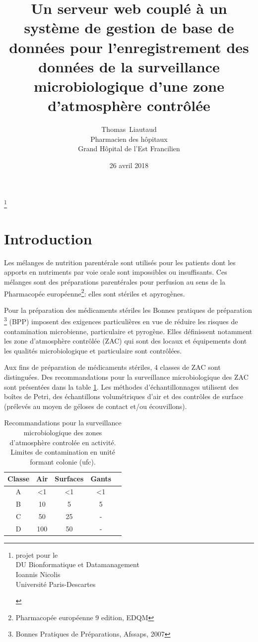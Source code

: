 \documentclass[12pt,a4paper,oneside]{article}
\author{Thomas~Liautaud\\Pharmacien des hôpitaux\\Grand Hôpital de l'Est Francilien}
\date{26 avril 2018}
\title{Un serveur web couplé à un système de gestion de base de données pour l'enregistrement des données de la surveillance microbiologique d'une zone d'atmosphère contrôlée}
\begin{document}
\maketitle
\thanks{\begin{center}
projet pour le \\DU Bionformatique et Datamanagement\\ Ioannis Nicolis\\Université Paris-Descartes
\end{center}}
\tableofcontents
\section{Introduction}
Les mélanges de nutrition parentérale sont utilisés pour les patients dont les apports en nutriments par voie orale sont impossibles ou insuffisants. Ces mélanges sont des préparations parentérales pour perfusion au sens de la Pharmacopée européenne\footnote{Pharmacopée européenne 9 edition, EDQM}: elles sont stériles et apyrogènes.

Pour la préparation des médicaments stériles les Bonnes pratiques de préparation \footnote{Bonnes Pratiques de Préparations, Afssaps, 2007} (BPP) imposent des  exigences  particulières en vue de réduire les risques de contamination microbienne, particulaire et pyrogène. Elles définissent notamment les zone d'atmosphère contrôlée (ZAC) qui sont des locaux et équipements dont les qualités microbiologique et particulaire sont contrôlées.

Aux fins de préparation de médicaments stériles, 4 classes de ZAC sont distinguées. Des recommandations pour la surveillance microbiologique des ZAC sont présentées dans la table \ref{zac}. Les méthodes d'échantillonnages utilisent des boîtes de Petri, des échantillons volumétriques d'air et des contrôles de surface (prélevés au moyen de géloses de contact et/ou écouvillons).
\begin{table}[h]
\caption{Recommandations pour la surveillance microbiologique des zones d'atmosphère controlée en activité. Limites de contamination en unité formant colonie (ufc).\label{zac}}
\begin{center}
\begin{tabular}{|c|c|c|c|c|}
	\hline
	\textbf{Classe} & \textbf{Air} &\textbf{Surfaces} & \textbf{Gants}\\
	\hline
	A & <1 & <1 & <1\\
	B & 10 & 5 & 5\\
	C & 50 & 25 & -\\
	D & 100 & 50 & -\\
	
	\hline
\end{tabular}
\end{center}
\end{table}
\end{document}
